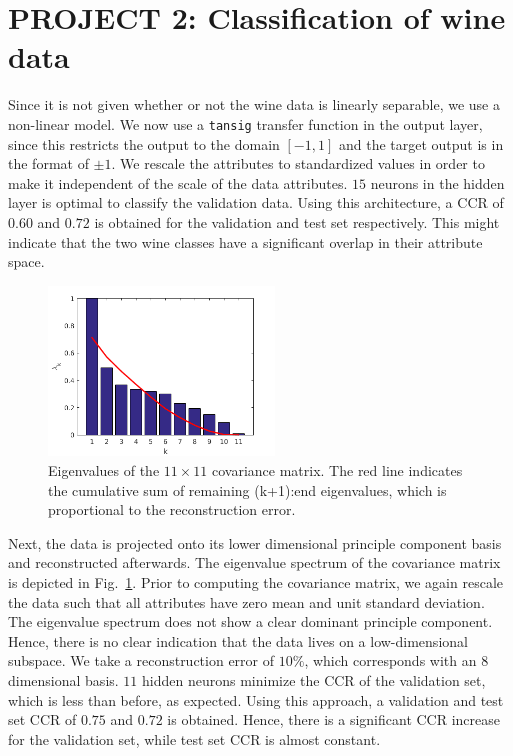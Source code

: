 \documentclass[pdftex,11pt,a4paper]{article}
\begin{document}
\section{PROJECT 2: Classification of wine data}\label{sec:classification}
Since it is not given whether or not the wine data is linearly separable, we use a non-linear model. We now use a \texttt{tansig} transfer function in the output layer, since this restricts the output to the domain $[-1,1]$ and the target output is in the format of $\pm 1$. We rescale the attributes to standardized values in order to make it independent of the scale of the data attributes. $15$ neurons in the hidden layer is optimal to classify the validation data. Using this architecture, a CCR of $0.60$  and $0.72$ is obtained for the validation and test set respectively. This might indicate that the two wine classes have a significant overlap in their attribute space.


\begin{figure}
\centering
\includegraphics[width=6cm]{figs/eigenvalues.png}
\caption{Eigenvalues of the $11\times11$ covariance matrix. The red line indicates the cumulative sum of remaining (k+1):end eigenvalues, which is proportional to the reconstruction error. \label{fig:eigenvalues}}
\end{figure}

Next, the data is projected onto its lower dimensional principle component basis and reconstructed afterwards. The eigenvalue spectrum of the covariance matrix is depicted in Fig.~\ref{fig:eigenvalues}. Prior to computing the covariance matrix, we again rescale the data such that all attributes have zero mean and unit standard deviation. The eigenvalue spectrum does not show a clear dominant principle component. Hence, there is no clear indication that the data lives on a low-dimensional subspace. We take a reconstruction error of $10\%$, which corresponds with an $8$ dimensional basis. $11$ hidden neurons minimize the CCR of the validation set, which is less than before, as expected. Using this approach, a validation and test set CCR of $0.75$ and $0.72$ is obtained. Hence, there is a significant CCR increase for the validation set, while test set CCR is almost constant.
\end{document}

